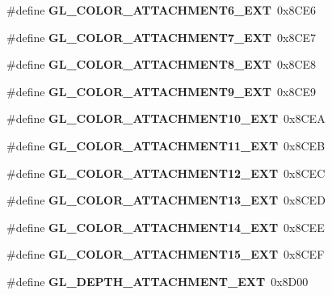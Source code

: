 \begin{DoxyCompactItemize}
\item 
\#define {\bfseries G\+L\+\_\+\+C\+O\+L\+O\+R\+\_\+\+A\+T\+T\+A\+C\+H\+M\+E\+N\+T6\+\_\+\+E\+X\+T}~0x8\+C\+E6\label{_s_d_l__opengl_8h_a57887f8f8eb2e0d40123a5be0d6618a2}

\item 
\#define {\bfseries G\+L\+\_\+\+C\+O\+L\+O\+R\+\_\+\+A\+T\+T\+A\+C\+H\+M\+E\+N\+T7\+\_\+\+E\+X\+T}~0x8\+C\+E7\label{_s_d_l__opengl_8h_ab540eeec29302c91687ccd26bbd6376e}

\item 
\#define {\bfseries G\+L\+\_\+\+C\+O\+L\+O\+R\+\_\+\+A\+T\+T\+A\+C\+H\+M\+E\+N\+T8\+\_\+\+E\+X\+T}~0x8\+C\+E8\label{_s_d_l__opengl_8h_a261067b4aa6b8948178607a586a86fe5}

\item 
\#define {\bfseries G\+L\+\_\+\+C\+O\+L\+O\+R\+\_\+\+A\+T\+T\+A\+C\+H\+M\+E\+N\+T9\+\_\+\+E\+X\+T}~0x8\+C\+E9\label{_s_d_l__opengl_8h_a96ce593a2ce620f5481621c8e556d3dd}

\item 
\#define {\bfseries G\+L\+\_\+\+C\+O\+L\+O\+R\+\_\+\+A\+T\+T\+A\+C\+H\+M\+E\+N\+T10\+\_\+\+E\+X\+T}~0x8\+C\+E\+A\label{_s_d_l__opengl_8h_a09fa29bdcf12849a2f31b43743e393bf}

\item 
\#define {\bfseries G\+L\+\_\+\+C\+O\+L\+O\+R\+\_\+\+A\+T\+T\+A\+C\+H\+M\+E\+N\+T11\+\_\+\+E\+X\+T}~0x8\+C\+E\+B\label{_s_d_l__opengl_8h_a7e0548e31a67349325353584ff33c681}

\item 
\#define {\bfseries G\+L\+\_\+\+C\+O\+L\+O\+R\+\_\+\+A\+T\+T\+A\+C\+H\+M\+E\+N\+T12\+\_\+\+E\+X\+T}~0x8\+C\+E\+C\label{_s_d_l__opengl_8h_adcf680d12d03d052b276df5bcbd7de88}

\item 
\#define {\bfseries G\+L\+\_\+\+C\+O\+L\+O\+R\+\_\+\+A\+T\+T\+A\+C\+H\+M\+E\+N\+T13\+\_\+\+E\+X\+T}~0x8\+C\+E\+D\label{_s_d_l__opengl_8h_aa7b8ddd745264c4b58892a3e66966526}

\item 
\#define {\bfseries G\+L\+\_\+\+C\+O\+L\+O\+R\+\_\+\+A\+T\+T\+A\+C\+H\+M\+E\+N\+T14\+\_\+\+E\+X\+T}~0x8\+C\+E\+E\label{_s_d_l__opengl_8h_a68304dbddaa9a0f8e6bb75a2e56043cc}

\item 
\#define {\bfseries G\+L\+\_\+\+C\+O\+L\+O\+R\+\_\+\+A\+T\+T\+A\+C\+H\+M\+E\+N\+T15\+\_\+\+E\+X\+T}~0x8\+C\+E\+F\label{_s_d_l__opengl_8h_a7c90bb127cfe0c5ad309c96d62a7b20f}

\item 
\#define {\bfseries G\+L\+\_\+\+D\+E\+P\+T\+H\+\_\+\+A\+T\+T\+A\+C\+H\+M\+E\+N\+T\+\_\+\+E\+X\+T}~0x8\+D00\label{_s_d_l__opengl_8h_a17871868e3ed0792b5782b36b94bd80c}


\end{DoxyCompactItemize}
